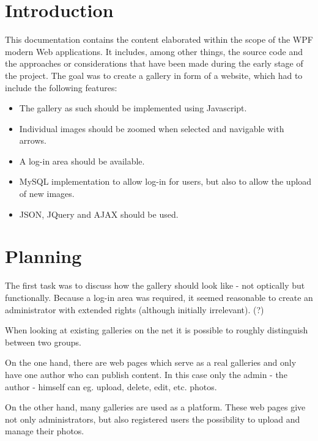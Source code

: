 \documentclass[a4paper,12pt,oneside]{article} %
\begin{document}
 \newpage %
  
 

  

\newpage

\section{Introduction}

This documentation contains the content elaborated within the scope 
of the WPF modern Web applications. It includes, among other things,
the source code and the approaches or considerations that have been 
made during the early stage of the project.
The goal was to create a gallery in form of a website, which had
to include the following features:
\begin{itemize}
\item The gallery as such should be implemented using Javascript. 
\item Individual images should be zoomed when selected and navigable with arrows. 
\item A log-in area should be available. 
\item MySQL implementation to allow log-in for users, but also to allow the upload of new images. 
\item JSON, JQuery and AJAX should be used.
\end{itemize}

\section{Planning}

The first task was to discuss how the gallery should look like
- not optically but functionally. Because a log-in area was required,
it seemed reasonable to create an administrator with extended
rights (although initially irrelevant). (?)

When looking at existing galleries on the net it is possible to 
roughly distinguish between two groups. 

On the one hand, there are web pages which serve as a real galleries and 
only have one author who can publish content. In this case only the admin 
- the author - himself can eg. upload, delete, edit, etc. photos.

On the other hand, many galleries are used as a platform.
These web pages give not only administrators, but also registered users 
the possibility to upload and manage their photos.
\end{document}
